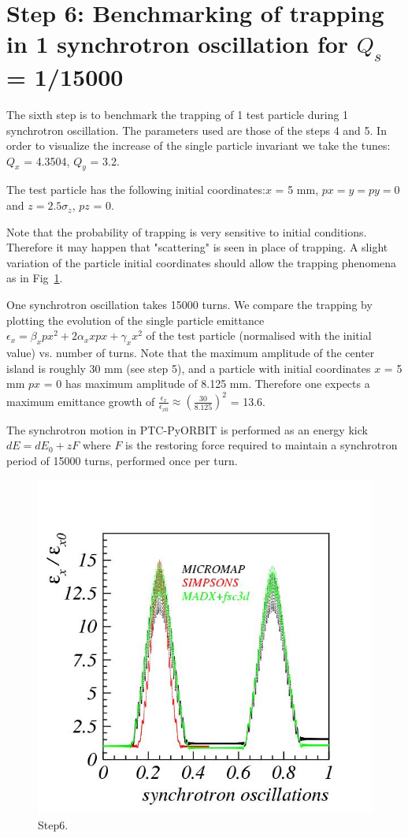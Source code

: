 \documentclass[a4paper]{cernatsnote}
\begin{document}
\section{Step 6: Benchmarking of trapping in 1 synchrotron oscillation for $Q_s$ = 1/15000}

The sixth step is to benchmark the trapping of 1 test particle during 1 synchrotron oscillation. The parameters used are those of the steps 4 and 5. In order to visualize the increase of the single particle invariant we take the tunes: $Q_x$ = 4.3504, $Q_y$ = 3.2.

The test particle has the following initial coordinates:$x$ = 5 mm, $px = y = py = 0$ and $z = 2.5 \sigma_z$, $pz$ = 0.

Note that the probability of trapping is very sensitive to initial conditions. Therefore it may happen that "scattering" is seen in place of trapping. A slight variation of the particle initial coordinates should allow the trapping phenomena as in Fig~\ref{fig:step6}.

One synchrotron oscillation takes 15000 turns. We compare the trapping by plotting the evolution of the single particle emittance $\epsilon_x = \beta_x px^2 + 2 \alpha_x x px + \gamma_x x^2$ of the test particle (normalised with the initial value) vs. number of turns. Note that the maximum amplitude of the center island is roughly 30 mm (see step 5), and a particle with initial coordinates $x$ = 5 mm $px$ = 0 has maximum amplitude of 8.125 mm. Therefore one expects a maximum emittance growth of $\frac{\epsilon_x}{\epsilon_{x0}} \approx \left( \frac{30}{8.125}\right)^2$ = 13.6.

The synchrotron motion in PTC-PyORBIT is performed as an energy kick $dE = dE_0 + z F$ where $F$ is the restoring force required to maintain a synchrotron period of 15000 turns, performed once per turn.

\begin{figure}[!htb]
        \centering
        \includegraphics[width=0.5\columnwidth]{Step6_trapping.jpg}
        \caption{Step6.}
        \label{fig:step6}
\end{figure}
\end{document}
